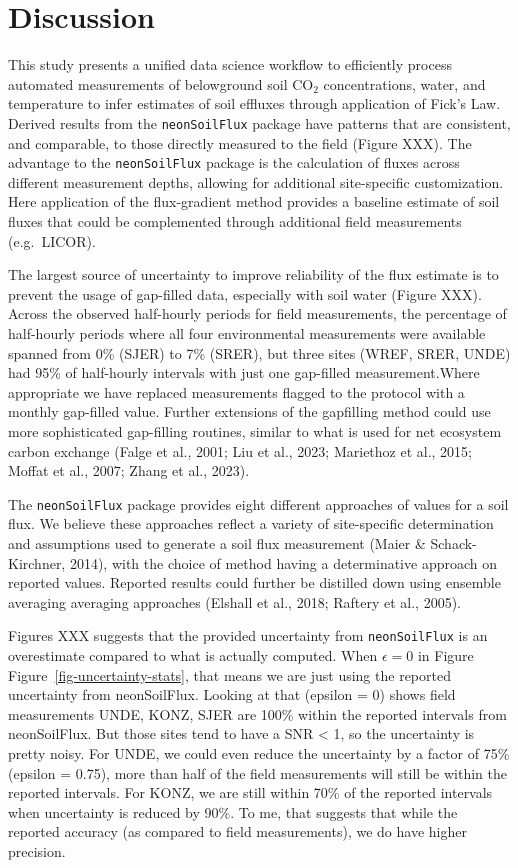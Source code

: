 \documentclass[
  letterpaper,
  DIV=11,
  numbers=noendperiod]{scrartcl}
\begin{document}
\section{Discussion}\label{discussion}

This study presents a unified data science workflow to efficiently
process automated measurements of belowground soil CO\(_{2}\)
concentrations, water, and temperature to infer estimates of soil
effluxes through application of Fick's Law. Derived results from the
\texttt{neonSoilFlux} package have patterns that are consistent, and
comparable, to those directly measured to the field (Figure XXX). The
advantage to the \texttt{neonSoilFlux} package is the calculation of
fluxes across different measurement depths, allowing for additional
site-specific customization. Here application of the flux-gradient
method provides a baseline estimate of soil fluxes that could be
complemented through additional field measurements (e.g.~LICOR).

The largest source of uncertainty to improve reliability of the flux
estimate is to prevent the usage of gap-filled data, especially with
soil water (Figure XXX). Across the observed half-hourly periods for
field measurements, the percentage of half-hourly periods where all four
environmental measurements were available spanned from 0\% (SJER) to 7\%
(SRER), but three sites (WREF, SRER, UNDE) had 95\% of half-hourly
intervals with just one gap-filled measurement.Where appropriate we have
replaced measurements flagged to the protocol with a monthly gap-filled
value. Further extensions of the gapfilling method could use more
sophisticated gap-filling routines, similar to what is used for net
ecosystem carbon exchange (Falge et al., 2001; Liu et al., 2023;
Mariethoz et al., 2015; Moffat et al., 2007; Zhang et al., 2023).

The \texttt{neonSoilFlux} package provides eight different approaches of
values for a soil flux. We believe these approaches reflect a variety of
site-specific determination and assumptions used to generate a soil flux
measurement (Maier \& Schack-Kirchner, 2014), with the choice of method
having a determinative approach on reported values. Reported results
could further be distilled down using ensemble averaging averaging
approaches (Elshall et al., 2018; Raftery et al., 2005).

Figures XXX suggests that the provided uncertainty from
\texttt{neonSoilFlux} is an overestimate compared to what is actually
computed. When \(\epsilon=0\) in Figure
Figure~\ref{fig-uncertainty-stats}, that means we are just using the
reported uncertainty from neonSoilFlux. Looking at that (epsilon = 0)
shows field measurements UNDE, KONZ, SJER are 100\% within the reported
intervals from neonSoilFlux. But those sites tend to have a SNR
\textless{} 1, so the uncertainty is pretty noisy. For UNDE, we could
even reduce the uncertainty by a factor of 75\% (epsilon = 0.75), more
than half of the field measurements will still be within the reported
intervals. For KONZ, we are still within 70\% of the reported intervals
when uncertainty is reduced by 90\%. To me, that suggests that while the
reported accuracy (as compared to field measurements), we do have higher
precision.
\end{document}

